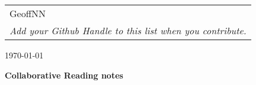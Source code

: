 \documentclass[12pt]{article}
\begin{document}
{\parindent 0pt
\begin{tabular}[t]{l}
GeoffNN
\\ \textit{Add your Github Handle to this list when you contribute.}
\end{tabular}  \hfill \today \vskip 0.2in }

\parindent 0pt
\parskip 8pt

\begin{center}
\large\bf Collaborative Reading notes
\end{center}

\bigskip





\end{document}
